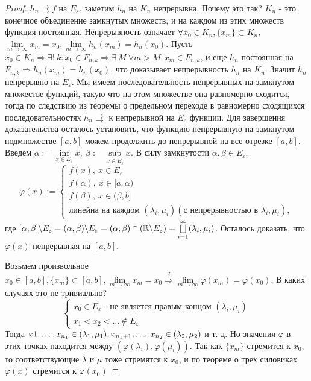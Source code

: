 \begin{proof}
$h_n \rightrightarrows f$ на $E_{\varepsilon}$, заметим $h_n \text{ на } K_n$ непрерывна. Почему это так? $K_n$ - это конечное объединение замкнутых множеств, и на каждом из этих множеств функция постоянная. Непрерывность означает $\forall x_0 \in K_n, \{x_m\}\subset K_n,$ ${ \lim\limits_{m\to\infty}x_m = x_0}, \lim\limits_{m\to\infty}h_n(x_m)=h_n(x_0).$ Пусть $x_0 \in K_n \Rightarrow \exists !\ k : x_0 \in F_{n, k} \Rightarrow \exists\ M\  \forall m > M\ \ x_m \in F_{n,k}$, и еще $h_n$ постоянная на $F_{n,k} \Rightarrow h_n(x_m)=h_n(x_0)$, что доказывает непрерывность $h_n$ на $K_n$. Значит $h_n$ непрерывно на $E_{\varepsilon}$. Мы имеем последовательность непрерывных на замкнутом множестве функций, такую что на этом множестве она равномерно сходится, тогда по следствию из теоремы о предельном переходе в равномерно сходящихся последовательностях $h_n \rightrightarrows$ к непрерывной на $E_{\varepsilon}$ функции. Для завершения доказательства осталось установить, что функцию непрерывную на замкнутом подмножестве $[a,b]$ можем продолжить до непрерывной на все отрезке $[a,b]$. Введем $\alpha := \inf\limits_{x\in E_\varepsilon}x,\ \beta := \sup\limits_{x\in E_\varepsilon}x$. В силу замкнутости $\alpha, \beta \in E_\varepsilon$.
\begin{equation*}
\varphi (x) := \begin{cases}
f(x),\ x\in E_\varepsilon\\
f(\alpha),\ x \in [a,\alpha)\\
f(\beta),\ x \in (\beta, b]\\
\text{линейна на каждом }(\lambda_i, \mu_i) (\text{с непрерывностью в }\lambda_i, \mu_i),
\end{cases}
\end{equation*}
где $[\alpha, \beta]\backslash E_\varepsilon = (\alpha, \beta)\backslash E_\varepsilon = (\alpha, \beta)\cap(\mathbb{R} \backslash E_\varepsilon)=\bigsqcup\limits_{i=1}^\infty(\lambda_i, \mu_i)$. Осталось доказать, что $\varphi (x)$ непрерывная на $[a,b].$

Возьмем произвольное $x_0 \in [a,b], \{x_m\}\subset [a,b], \lim\limits_{m\to\infty}x_m=x_0 \overset{?}{\Rightarrow} \lim\limits_{m\to\infty}\varphi (x_m)=\varphi (x_0)$. В каких случаях это не тривиально? 
\begin{equation*}
\begin{cases}
 x_0 \in E_\varepsilon\text{ - не является правым концом } (\lambda_i, \mu_i) \\
 x_1 < x_2 < \ldots \notin E_\varepsilon
\end{cases}
\end{equation*}
Тогда $x1,\ldots, x_{n_1} \in (\lambda_1, \mu_1),\newline x_{n_1+1}, \ldots, x_{n_2} \in (\lambda_2, \mu_2)$ и т. д. Но значения $\varphi$ в этих точках находится между $(\varphi(\lambda_i),\varphi( \mu_i)).$ Так как $\{x_m\}$ стремится к $x_0$, то соответствующие $\lambda$ и $\mu$ тоже стремятся к $x_0$, и по теореме о трех силовиках $\varphi(x)$ стремится к $\varphi(x_0)$


\end{proof}
